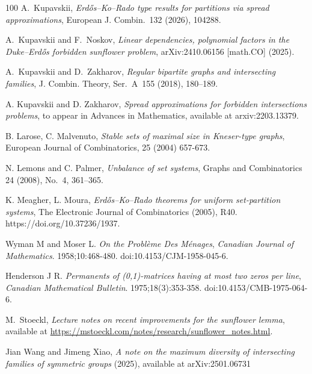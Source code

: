 \documentclass[11pt]{extarticle}
\numberwithin{equation}{section} %
\theoremstyle{plain}
\theoremstyle{definition}
\begin{document}
\begin{thebibliography}{100}
A.~Kupavskii, {\it Erd\H{o}s--Ko--Rado type results for partitions via spread approximations},
European J. Combin.~132 (2026), 104288.

A.~Kupavskii and F.~Noskov, {\it Linear dependencies, polynomial factors in the Duke--Erd\H{o}s forbidden sunflower problem},
arXiv:2410.06156 [math.CO] (2025).

A.~Kupavskii and D.~Zakharov, {\it Regular bipartite graphs and intersecting families},
J. Combin. Theory, Ser.~A~155 (2018), 180--189.

 A. Kupavskii and D. Zakharov, {\it Spread approximations for forbidden intersections problems},  to appear in Advances in Mathematics, available at arxiv:2203.13379.

 B. Larose, C. Malvenuto, {\it Stable sets of maximal size in Kneser-type graphs},  European Journal of Combinatorics, 25 (2004) 657-673.

 N. Lemons and C. Palmer, {\it Unbalance of set systems}, Graphs and Combinatorics 24 (2008), No.~4, 361--365.

 K. Meagher, L. Moura, {\it Erd\H os--Ko--Rado theorems for uniform set-partition systems}, The Electronic Journal of Combinatorics (2005), R40. https://doi.org/10.37236/1937.

 Wyman M and Moser L. {\it On the Problème Des Ménages}, \textit{Canadian Journal of Mathematics}. 1958;10:468-480. doi:10.4153/CJM-1958-045-6.

 Henderson J R. {\it Permanents of (0,1)-matrices having at most two zeros per line}, \textit{Canadian Mathematical Bulletin}. 1975;18(3):353-358. doi:10.4153/CMB-1975-064-6.


M.~Stoeckl, {\it Lecture notes on recent improvements for the sunflower lemma},
available at \url{https://mstoeckl.com/notes/research/sunflower_notes.html}.

 Jian Wang and Jimeng Xiao, {\it A note on the maximum diversity of intersecting families of symmetric groups} (2025), available at arXiv:2501.06731 


\end{thebibliography}
\end{document}
